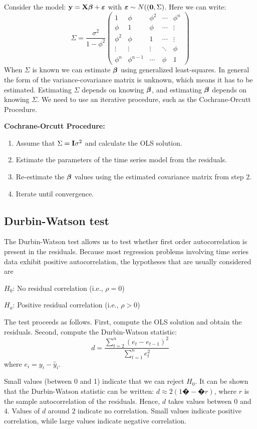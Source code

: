 Consider the model: $\mathbf{y} = \mathbf{X} \mbox{\boldmath $\beta$} + \mbox{\boldmath $\varepsilon$}$ with $\mbox{\boldmath $\varepsilon$} \sim N((\mathbf{0}, \Sigma)$.
Here we can write:
$$
\Sigma = \frac{\sigma^2}{1-\phi^2} \left(\begin{array}{ccccc}
        1 & \phi  & \phi^2  & \cdots & \phi^n  \\
        \phi & 1 & \phi & \cdots & \vdots \\
        \phi^2 & \phi & 1 & \cdots & \vdots \\
        \vdots & \vdots & \vdots &\ddots & \phi \\
        \phi^n & \phi^{n-1} & \cdots & \phi & 1
\end{array}\right)
$$
When $\Sigma$ is known we can estimate $\mbox{\boldmath $\beta$}$ using generalized least-squares.
In general the form of the variance-covariance matrix is unknown, which means it has to be estimated.
Estimating $\Sigma$ depends on knowing $\mbox{\boldmath $\beta$}$, and estimating $\mbox{\boldmath $\beta$}$ depends on knowing $\Sigma$. 
We need to use an iterative procedure, such as the Cochrane-Orcutt Procedure.

\vb
{\bf Cochrane-Orcutt Procedure:}
\begin{enumerate}
\item Assume that $\Sigma = \mathbf{I} \sigma^2$ and calculate the OLS solution.
\item Estimate the parameters of the time series model from the residuals.
\item Re-estimate the $\mbox{\boldmath $\beta$}$ values using  the estimated covariance matrix from step 2.
\item Iterate until convergence.
\end{enumerate}


\subsection{Durbin-Watson test}

The Durbin-Watson test allows us to test whether first order autocorrelation is present in the residuals.
Because most regression problems involving time series data exhibit positive autocorrelation, the hypotheses that are usually considered are

\hskip1cm  $H_0$: No residual correlation (i.e., $\rho = 0$)

\hskip1cm   $H_a$: Positive residual correlation (i.e., $\rho > 0$)


The test proceeds as follows. First, compute the OLS solution and obtain the residuals. Second, compute the Durbin-Watson statistic:
$$
d = \frac{\sum_{t=2}^n (e_t - e_{t-1})^2}{\sum_{t=1}^n e_t^2}
$$
where $e_i = y_i - \hat y_i$.

Small values (between 0 and 1) indicate that we can reject $H_0$. It can be shown that the Durbin-Watson statistic can be written: $d \approx 2(1�-�r)$, where $r$ is the sample autocorrelation of the residuals. Hence, $d$ takes values between $0$ and $4$. Values of $d$ around $2$ indicate no correlation. Small values indicate positive correlation, while large values indicate negative correlation.


